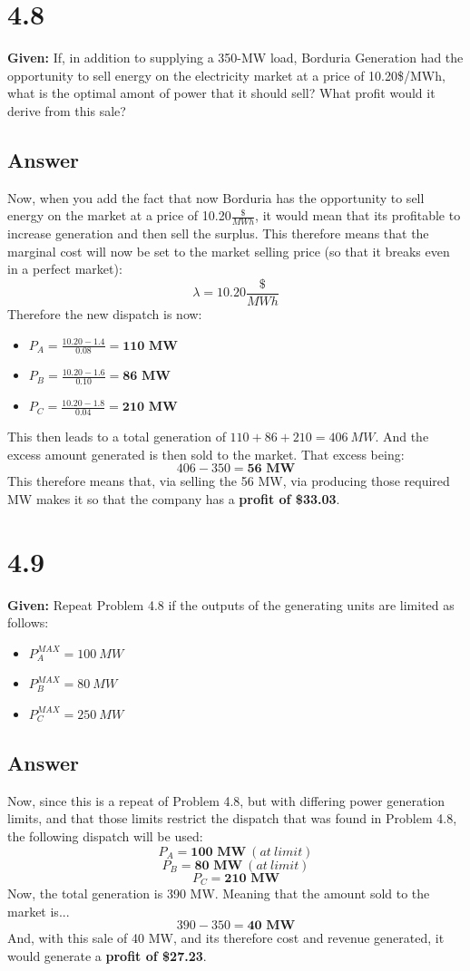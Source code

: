 \documentclass{article}
\begin{document}
\section{4.8}
\textbf{Given:} If, in addition to supplying a 350-MW load, Borduria Generation had the opportunity to sell energy on the electricity market at a price of 10.20\$/MWh, what is the optimal amont of power that it should sell? What profit would it derive from this sale?
\subsection{Answer}
Now, when you add the fact that now Borduria has the opportunity to sell energy on the market at a price of 10.20$\frac{\$}{MWh}$, it would mean that its profitable to increase generation and then sell the surplus. This therefore means that the marginal cost will now be set to the market selling price (so that it breaks even in a perfect market):
$$ \lambda = 10.20\frac{\$}{MWh} $$
Therefore the new dispatch is now:
\begin{itemize}
	\item $ P_A = \frac{10.20 - 1.4}{0.08} = \textbf{110 MW} $
	\item $ P_B = \frac{10.20 - 1.6}{0.10} = \textbf{86 MW} $
	\item $ P_C = \frac{10.20 - 1.8}{0.04} = \textbf{210 MW} $
\end{itemize}
This then leads to a total generation of $110+86+210 = 406\ MW$. And the excess amount generated is then sold to the market. That excess being:
$$ 406 - 350 = \textbf{56 MW} $$
This therefore means that, via selling the 56 MW, via producing those required MW makes it so that the company has a \textbf{profit of \$33.03}.

\section{4.9}
\textbf{Given:} Repeat Problem 4.8 if the outputs of the generating units are limited as follows:
\begin{itemize}
	\item $P_A^{MAX} = 100\ MW$
	\item $P_B^{MAX} = 80\ MW$
	\item $P_C^{MAX} = 250\ MW$
\end{itemize}
\subsection{Answer}
Now, since this is a repeat of Problem 4.8, but with differing power generation limits, and that those limits restrict the dispatch that was found in Problem 4.8, the following dispatch will be used:
$$ P_A = \textbf{100 MW}\ (at\ limit) $$
$$ P_B = \textbf{80 MW}\ (at\ limit) $$
$$ P_C = \textbf{210 MW} $$
Now, the total generation is 390 MW. Meaning that the amount sold to the market is...
$$ 390 - 350 = \textbf{40 MW} $$
And, with this sale of 40 MW, and its therefore cost and revenue generated, it would generate a \textbf{profit of \$27.23}.
\end{document}
